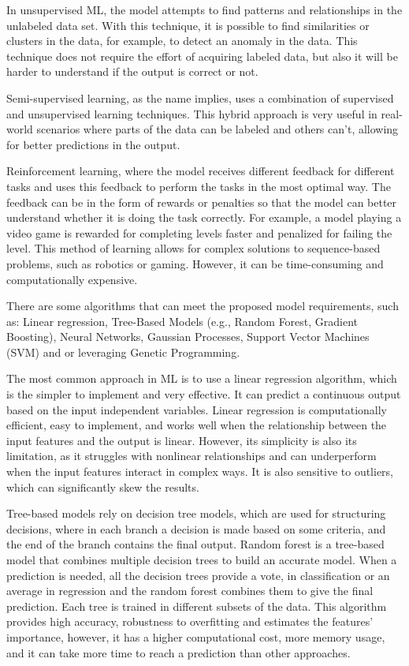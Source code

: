 In unsupervised ML, the model attempts to find patterns and relationships in the unlabeled data set. With this technique, it is possible to find similarities or clusters in the data, for example, to detect an anomaly in the data. This technique does not require the effort of acquiring labeled data, but also it will be harder to understand if the output is correct or not.

Semi-supervised learning, as the name implies, uses a combination of supervised and unsupervised learning techniques. This hybrid approach is very useful in real-world scenarios where parts of the data can be labeled and others can't, allowing for better predictions in the output.

Reinforcement learning, where the model receives different feedback for different tasks and uses this feedback to perform the tasks in the most optimal way. The feedback can be in the form of rewards or penalties so that the model can better understand whether it is doing the task correctly. For example, a model playing a video game is rewarded for completing levels faster and penalized for failing the level. This method of learning allows for complex solutions to sequence-based problems, such as robotics or gaming. However, it can be time-consuming and computationally expensive.

There are some algorithms that can meet the proposed model requirements, such as: Linear regression, Tree-Based Models (e.g., Random Forest, Gradient Boosting), Neural Networks, Gaussian Processes, Support Vector Machines (SVM) and or leveraging Genetic Programming.

The most common approach in ML is to use a linear regression algorithm, which is the simpler to implement and very effective. It can predict a continuous output based on the input independent variables. Linear regression is computationally efficient, easy to implement, and works well when the relationship between the input features and the output is linear. However, its simplicity is also its limitation, as it struggles with nonlinear relationships and can underperform when the input features interact in complex ways. It is also sensitive to outliers, which can significantly skew the results.

Tree-based models rely on decision tree models, which are used for structuring decisions, where in each branch a decision is made based on some criteria, and the end of the branch contains the final output. Random forest is a tree-based model that combines multiple decision trees to build an accurate model. When a prediction is needed, all the decision trees provide a vote, in classification or an average in regression and the random forest combines them to give the final prediction. Each tree is trained in different subsets of the data. This algorithm provides high accuracy, robustness to overfitting and estimates the features' importance, however, it has a higher computational cost, more memory usage, and it can take more time to reach a prediction than other approaches.

